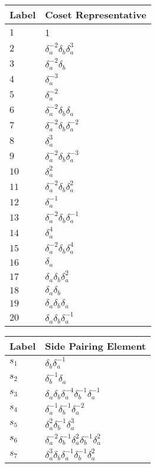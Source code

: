 \documentclass{article}
\begin{document}
\begin{center}
\begin{tabular}{ll}
\toprule
Label & Coset Representative\\
\midrule
$1$ & 1 \\
$2$ & $\delta_a^{-2}\delta_b^{}\delta_a^{3}$ \\
$3$ & $\delta_a^{-2}\delta_b^{}$ \\
$4$ & $\delta_a^{-3}$ \\
$5$ & $\delta_a^{-2}$ \\
$6$ & $\delta_a^{-2}\delta_b^{}\delta_a^{}$ \\
$7$ & $\delta_a^{-2}\delta_b^{}\delta_a^{-2}$ \\
$8$ & $\delta_a^{3}$ \\
$9$ & $\delta_a^{-2}\delta_b^{}\delta_a^{-3}$ \\
$10$ & $\delta_a^{2}$ \\
$11$ & $\delta_a^{-2}\delta_b^{}\delta_a^{2}$ \\
$12$ & $\delta_a^{-1}$ \\
$13$ & $\delta_a^{-2}\delta_b^{}\delta_a^{-1}$ \\
$14$ & $\delta_a^{4}$ \\
$15$ & $\delta_a^{-2}\delta_b^{}\delta_a^{4}$ \\
$16$ & $\delta_a^{}$ \\
$17$ & $\delta_a^{}\delta_b^{}\delta_a^{2}$ \\
$18$ & $\delta_a^{}\delta_b^{}$ \\
$19$ & $\delta_a^{}\delta_b^{}\delta_a^{}$ \\
$20$ & $\delta_a^{}\delta_b^{}\delta_a^{-1}$ \\
\bottomrule
\end{tabular}
\hfill
\begin{tabular}{ll}
\toprule
Label & Side Pairing Element\\
\midrule
$s_{1}$ & $\delta_b^{}\delta_a^{-1}$ \\
$s_{2}$ & $\delta_b^{-1}\delta_a^{}$ \\
$s_{3}$ & $\delta_a^{}\delta_b^{}\delta_a^{-4}\delta_b^{-1}\delta_a^{-1}$ \\
$s_{4}$ & $\delta_a^{-1}\delta_b^{-1}\delta_a^{-2}$ \\
$s_{5}$ & $\delta_a^{2}\delta_b^{-1}\delta_a^{3}$ \\
$s_{6}$ & $\delta_a^{-2}\delta_b^{-1}\delta_a^{2}\delta_b^{-1}\delta_a^{2}$ \\
$s_{7}$ & $\delta_a^{3}\delta_b^{}\delta_a^{-1}\delta_b^{-1}\delta_a^{2}$ \\

\end{tabular}
\end{center}
\end{document}

